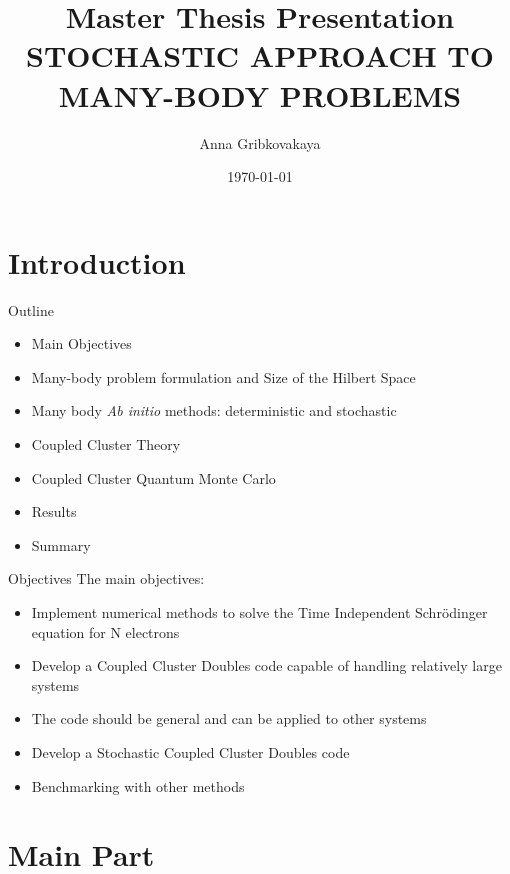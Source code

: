 \documentclass{beamer}
\title{Master Thesis Presentation\\
STOCHASTIC APPROACH TO MANY-BODY PROBLEMS}
\date{\today}
\author{Anna Gribkovakaya}
\institute{University of Oslo}
\begin{document}
  \maketitle
  \section{Introduction}
   \begin{frame}{Outline}
   \begin{itemize}
   	\item Main Objectives
   		\item Many-body problem formulation and Size of the Hilbert Space
   	\item Many body \textit{Ab initio} methods: deterministic and stochastic
   	\item Coupled Cluster Theory
   	\item Coupled Cluster Quantum Monte Carlo
   	\item Results
   	\item Summary
   \end{itemize}
 \end{frame}
   \begin{frame}{Objectives}
	The main objectives:
	\begin{itemize}
 	\item Implement numerical methods to solve the Time Independent Schr\"{o}dinger equation for N electrons
 	\item Develop a Coupled Cluster Doubles code capable of handling relatively large systems
 	\item The code should be general and can be applied to other systems
 	\item Develop a Stochastic Coupled Cluster Doubles code
 	\item Benchmarking with other methods
	\end{itemize}
	\end{frame}


  \section{Main Part}
  
\end{document}
